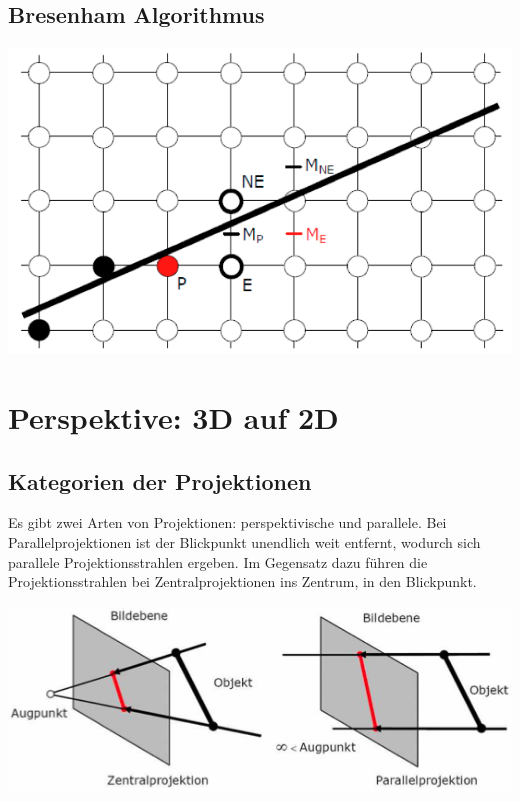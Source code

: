\documentclass[10pt]{article}
\begin{document}
\subsection{Bresenham Algorithmus}
\begin{center}
	\includegraphics[scale=0.4]{bersenhan.png}
\end{center}


\newpage
\section{Perspektive: 3D auf 2D}
\subsection{Kategorien der Projektionen}
Es gibt zwei Arten von Projektionen: perspektivische und parallele. Bei Parallelprojektionen ist der Blickpunkt unendlich weit entfernt, wodurch sich parallele Projektionsstrahlen ergeben. Im Gegensatz dazu führen die Projektionsstrahlen bei Zentralprojektionen ins Zentrum, in den Blickpunkt.
\begin{center}
	\includegraphics[scale=0.4]{projektionen.png}
\end{center}
\end{document}
